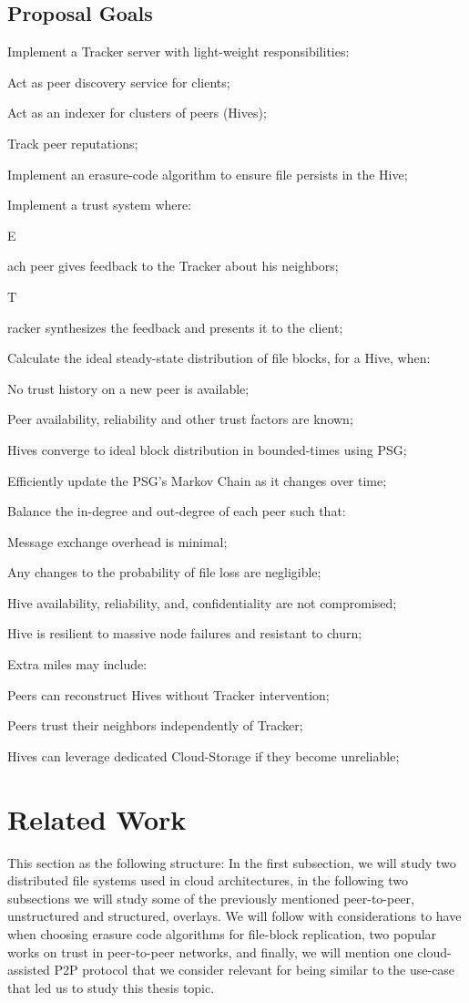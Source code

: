 \documentclass[runningheads]{llncs}
\newcommand{\SubItem}[1]{{\setlength\itemindent{15pt} \item[-] #1}}
\begin{document}
\subsection{Proposal Goals}\label{subsec:intro}
\begin{itemize}
    \item Implement a Tracker server with light-weight responsibilities:
        \SubItem{Act as peer discovery service for clients;}
        \SubItem{Act as an indexer for clusters of peers (Hives);}
        \SubItem{Track peer reputations;}
    \item Implement an erasure-code algorithm to ensure file persists in the Hive;
    \item Implement a trust system where:
        \SubItem Each peer gives feedback to the Tracker about his neighbors;
        \SubItem Tracker synthesizes the feedback and presents it to the client;
    \item Calculate the ideal steady-state distribution of file blocks, for a Hive, when:
        \SubItem{No trust history on a new peer is available;}
        \SubItem{Peer availability, reliability and other trust factors are known;}
    \item Hives converge to ideal block distribution in bounded-times using PSG;
    \item Efficiently update the PSG's Markov Chain as it changes over time;
    \item Balance the in-degree and out-degree of each peer such that:
        \SubItem{Message exchange overhead is minimal;}
        \SubItem{Any changes to the probability of file loss are negligible;}
        \SubItem{Hive availability, reliability, and, confidentiality are not compromised;}
        \SubItem{Hive is resilient to massive node failures and resistant to churn;}
    \item Extra miles may include:
        \SubItem{Peers can reconstruct Hives without Tracker intervention;}
        \SubItem{Peers trust their neighbors independently of Tracker;}
        \SubItem{Hives can leverage dedicated Cloud-Storage if they become unreliable;}
\end{itemize}

\newpage\section{Related Work}\label{sec:relatedwork}
This section as the following structure: In the first subsection, we will study two distributed file systems used in cloud architectures, in the following two subsections we will study some of the previously mentioned peer-to-peer, unstructured and structured, overlays. We will follow with considerations to have when choosing erasure code algorithms for file-block replication, two popular works on trust in peer-to-peer networks, and finally, we will mention one cloud-assisted P2P protocol that we consider relevant for being similar to the use-case that led us to study this thesis topic.
\end{document}
